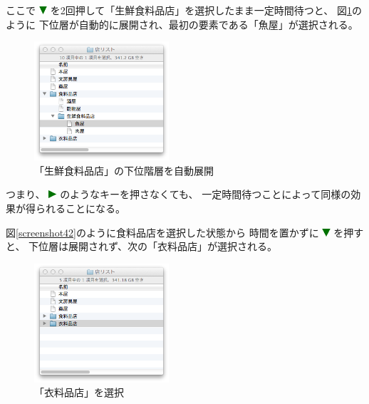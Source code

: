 \documentclass[twoside]{wiss}
\def\figwidth{50mm}
\def\downtriangle{ \includegraphics[width=3mm,bb=0 0 36 36]{figures/downtriangle.pdf} }
\def\righttriangle{ \includegraphics[width=3mm,bb=0 0 36 36]{figures/righttriangle.pdf} }
\begin{document}
\noindent
ここで{\downtriangle}を2回押して「生鮮食料品店」を選択したまま一定時間待つと、
図\ref{screenshot8}のように
下位層が自動的に展開され、最初の要素である「魚屋」が選択される。

\begin{figure}[H]
\centerline{\includegraphics[width=\figwidth,bb=0 0 344 304]{figures/1b1955309d3baefda8e1b614cf06df62.png}}
\caption{「生鮮食料品店」の下位階層を自動展開}
\label{screenshot8}
\end{figure}

\noindent
つまり、{\righttriangle}のようなキーを押さなくても、
一定時間待つことによって同様の効果が得られることになる。

図\ref{screenshot42}のように食料品店を選択した状態から
時間を置かずに{\downtriangle}を押すと、
下位層は展開されず、次の「衣料品店」が選択される。

\begin{figure}[H]
\centerline{\includegraphics[width=\figwidth,bb=0 0 344 304]{figures/c5c757d8f79d5a8a9c85eef25600ba66.png}}
\caption{「衣料品店」を選択}
\label{screenshot9}
\end{figure}
\end{document}

